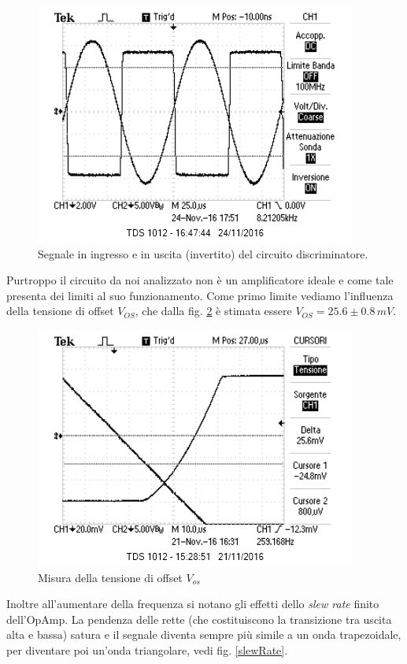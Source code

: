 \documentclass[10pt,a4paper]{article}
\begin{document}
\begin{figure}[htb!]
\centering
\includegraphics[scale=1.0]{immagini/discriminatore.png}
\caption{Segnale in ingresso e in uscita (invertito) del circuito discriminatore.}
\label{funzionaBene}
\end{figure}

Purtroppo il circuito da noi analizzato non è un amplificatore ideale e come tale presenta dei limiti al suo funzionamento. Come primo limite vediamo l'influenza della tensione di offset $V_{OS}$, che dalla fig. \ref{Vos} è stimata essere $V_{OS} = 25.6 \pm 0.8 \, mV$.\\

\begin{figure}[htb!]
\centering
\includegraphics[scale=1.0]{immagini/Vos.png}
\caption{Misura della tensione di offset $V_{os}$}
\label{Vos}
\end{figure}

Inoltre all'aumentare della frequenza si notano gli effetti dello \emph{slew rate} finito dell'OpAmp. La pendenza delle rette (che costituiscono la transizione tra uscita alta e bassa) satura e il segnale diventa sempre più simile a un onda trapezoidale, per diventare poi un'onda triangolare, vedi fig. \ref{slewRate}.\\
\end{document}
